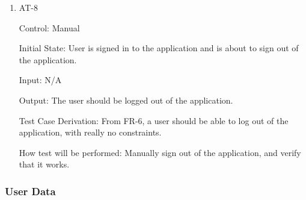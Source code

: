 \documentclass[12pt, titlepage]{article}
\begin{document}
\begin{enumerate}
\item{AT-8\\}

Control: Manual
					
Initial State: User is signed in to the application and is about to sign out of the application.
					
Input: N/A
					
Output: The user should be logged out of the application.

Test Case Derivation: From FR-6, a user should be able to log out of the application, with really no constraints.

How test will be performed: Manually sign out of the application, and verify that it works.



					
					
					



\end{enumerate}

\subsubsection{User Data}
\end{document}
